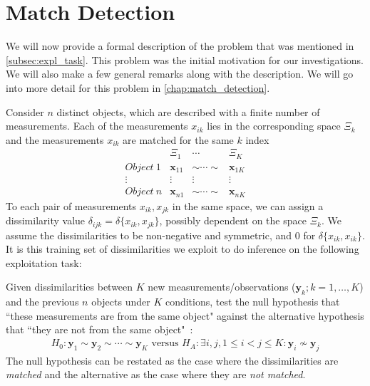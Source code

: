 \documentclass[12pt,oneside,final]{thesis}
\begin{document}
\section{Match Detection}

We will now provide a formal description of the problem that was mentioned in \autoref{subsec:expl_task}. This problem was the initial motivation for our investigations. We will also make a few general remarks along with the description. We will go into more detail for this problem in  \autoref{chap:match_detection}.

Consider $n$  distinct objects, which are described with a finite number of measurements. Each of the measurements $x_{ik}$ lies in  the corresponding space $\Xi_k$ and the  measurements $x_{ik}$ are matched for the same $k$ index
\[  \begin{array}{cccc}
        & \Xi_1 & \cdots & \Xi_K\\
        Object ~ 1 & \bm{x}_{11} & \sim \cdots \sim & \bm{x}_{1K} \\
        \vdots & \vdots & \vdots & \vdots \\
        Object ~ n & \bm{x}_{n1} & \sim \cdots \sim & \bm{x}_{nK}
      \end{array}      
\]
To each pair of measurements $x_{ik},x_{jk}$ in the same space, we can assign a dissimilarity value $\delta_{ijk}=\delta\{x_{ik},x_{jk}\}$, possibly dependent on the space $\Xi_k$. We assume the dissimilarities to be non-negative and  symmetric, and 0 for $\delta\{x_{ik},x_{ik}\}$.  It is this training set of  dissimilarities we exploit to do inference on the following exploitation task:

 Given dissimilarities between  $K$ new measurements/observations ($\bm{y}_{k};k=1,\ldots,K$) and the previous $n$ objects under $K$ conditions, 
test the null hypothesis  that ``these measurements are from the same  object"  against the alternative hypothesis that ``they are not  from the same  object"~\cite{JOFC}:
    \[
\begin{array}{l}
    H_0: \bm{y}_{1} \sim \bm{y}_{2} \sim \cdots \sim \bm{y}_{K}
 \text{ versus } 
 H_A: \exists i, j , 1\leq i < j \leq K :\bm{y}_{i} \nsim \bm{y}_{j}  
\end{array}
\]
 The null hypothesis can be restated as the case where the dissimilarities are \emph{matched} and the alternative as the case where they are \emph{not matched}.
\end{document}

